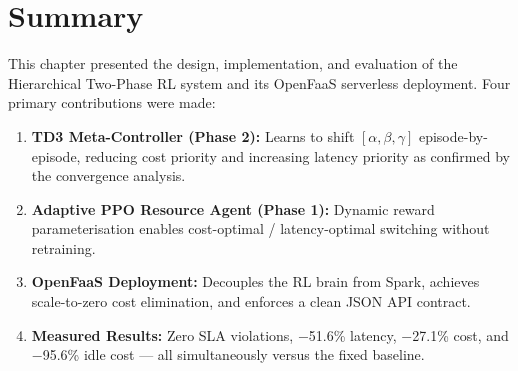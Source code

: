 \section{Summary}
\label{sec:summary_hier}
This chapter presented the design, implementation, and evaluation of the Hierarchical
Two-Phase RL system and its OpenFaaS serverless deployment. Four primary contributions
were made:
\begin{enumerate}
  \item \textbf{TD3 Meta-Controller (Phase 2):} Learns to shift $[\alpha,\beta,\gamma]$
        episode-by-episode, reducing cost priority and increasing latency priority as
        confirmed by the convergence analysis.
  \item \textbf{Adaptive PPO Resource Agent (Phase 1):} Dynamic reward parameterisation
        enables cost-optimal / latency-optimal switching without retraining.
  \item \textbf{OpenFaaS Deployment:} Decouples the RL brain from Spark, achieves
        scale-to-zero cost elimination, and enforces a clean JSON API contract.
  \item \textbf{Measured Results:} Zero SLA violations, $-$51.6\% latency, $-$27.1\%
        cost, and $-$95.6\% idle cost — all simultaneously versus the fixed baseline.
\end{enumerate}
